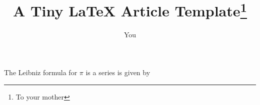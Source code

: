 \documentclass{article}
\title{A Tiny \LaTeX{} Article Template\thanks{To your mother}}
\author{You}
\begin{document}
\maketitle

The Leibniz formula for $\pi$ is a series is given by


\end{document}

